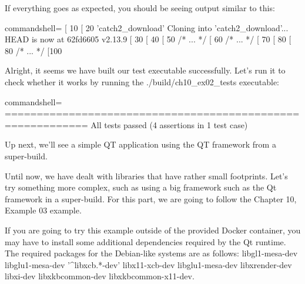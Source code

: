 
If everything goes as expected, you should be seeing output similar to this:

\begin{tcblisting}{commandshell={}}
[ 10%
[ 20%
  'catch2_download'
Cloning into 'catch2_download'...
HEAD is now at 62fd6605 v2.13.9
[ 30%
[ 40%
[ 50%
/* ... */
[ 60%
/* ... */
[ 70%
[ 80%
[ 80%
/* ... */
[100%
\end{tcblisting}

Alright, it seems we have built our test executable successfully. Let's run it to check whether it works by running the ./build/ch10\_ex02\_tests executable:

\begin{tcblisting}{commandshell={}}
===========================================================
All tests passed (4 assertions in 1 test case)
\end{tcblisting}

Up next, we'll see a simple QT application using the QT framework from a super-build.


Until now, we have dealt with libraries that have rather small footprints. Let's try something more complex, such as using a big framework such as the Qt framework in a super-build. For this part, we are going to follow the Chapter 10, Example 03 example.

\begin{tcolorbox}[colback=blue!5!white,colframe=blue!75!black,title=Important note]
If you are going to try this example outside of the provided Docker container, you may have to install some additional dependencies required by the Qt runtime. The required packages for the Debian-like systems are as follows: libgl1-mesa-dev libglu1-mesa-dev '\^{}libxcb.*-dev' libx11-xcb-dev libglu1-mesa-dev libxrender-dev libxi-dev libxkbcommon-dev libxkbcommon-x11-dev.
\end{tcolorbox}

